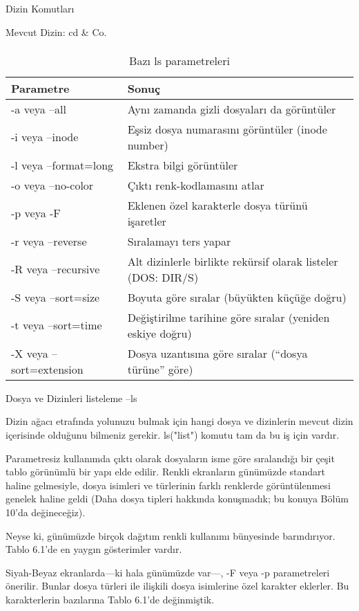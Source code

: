 \begin{section}{Dizin Komutları}
\begin{subsection}{Mevcut Dizin: cd \& Co.}
\paragraph{}{
\begin {table}[H]
\caption {Bazı ls parametreleri} \label{tab:title} 
\begin{tabular}{l l}
\hline
Parametre & Sonuç \\
\hline
-a veya --all 	&	Aynı zamanda gizli dosyaları da görüntüler \\
-i veya --inode 	&	Eşsiz dosya numarasını görüntüler (inode number) \\
-l veya --format=long 	&	Ekstra bilgi görüntüler \\
-o veya --no-color 	&	Çıktı renk-kodlamasını atlar \\
-p veya -F 	&	Eklenen özel karakterle dosya türünü işaretler \\
-r veya --reverse 	&	Sıralamayı ters yapar \\
-R veya --recursive 	&	Alt dizinlerle birlikte rekürsif olarak listeler (DOS: DIR/S) \\
-S veya --sort=size 	&	Boyuta göre sıralar (büyükten küçüğe doğru) \\
-t veya --sort=time 	&	Değiştirilme tarihine göre sıralar (yeniden eskiye doğru) \\
-X veya --sort=extension 	&	Dosya uzantısına göre sıralar (“dosya türüne” göre) \\
\hline
\end{tabular}
\end {table}
}
\end{subsection}
\begin{subsection}{Dosya ve Dizinleri listeleme --ls}

Dizin ağacı etrafında yolunuzu bulmak için hangi dosya ve dizinlerin mevcut dizin içerisinde olduğunu bilmeniz gerekir. ls("list") komutu tam da bu iş için vardır.

	Parametresiz kullanımda çıktı olarak dosyaların isme göre sıralandığı bir çeşit tablo görünümlü bir yapı elde edilir. Renkli ekranların günümüzde standart haline gelmesiyle, dosya isimleri ve türlerinin farklı renklerde görüntülenmesi genelek haline geldi (Daha dosya tipleri hakkında konuşmadık; bu konuya Bölüm 10'da değineceğiz).
	
Neyse ki, günümüzde birçok dağıtım renkli kullanımı bünyesinde barındırıyor. Tablo 6.1'de en yaygın gösterimler vardır.

	Siyah-Beyaz ekranlarda—ki hala günümüzde var—, -F veya -p parametreleri önerilir. Bunlar dosya türleri ile ilişkili dosya isimlerine özel karakter eklerler. Bu karakterlerin bazılarına Tablo 6.1'de değinmiştik.
	

\end{subsection}
\end{section}
